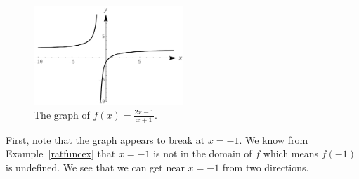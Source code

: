 \begin{figure}[H]
	\begin{center}
			\includegraphics[width=0.5\textwidth]{fig_algebraic_8}
	\caption{The graph of $f(x)=\frac{2x-1}{x+1}$.}
	\label{fig_algebraic_8}
	\end{center}
\end{figure}

First, note that the graph appears to break at $x=-1$. We know from Example~\ref{ratfuncex} that $x=-1$ is not in the domain of $f$ which means $f(-1)$ is undefined. We see that we can get near $x=-1$ from two directions.  






